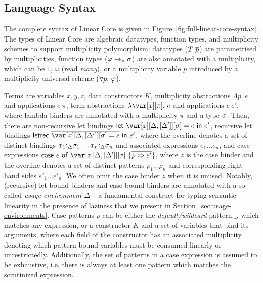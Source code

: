 \documentclass[acmsmall,review,screen]{acmart}
\newcommand{\llet}[2]{\mathsf{let}~#1~\mathsf{in}~#2}
\newcommand{\lletrec}[2]{\mathsf{letrec}~#1~\mathsf{in}~#2}
\newcommand{\ccase}[2]{\mathsf{case}~#1~\mathsf{of}~#2}
\begin{document}
%


\subsection{Language Syntax}

The complete syntax of Linear Core is given in Figure~\ref{fig:full-linear-core-syntax}.
%
The types of Linear Core are algebraic datatypes, function types, and
multiplicity schemes to support multiplicity polymorphism: datatypes
($T~\overline{p}$) are parametrised by multiplicities, function types
($\varphi\to_\pi\sigma$) are also annotated with a multiplicity, which can be $1$,
$\omega$ (read \emph{many}), or a multiplicity variable $p$ introduced by a
multiplicity universal scheme ($\forall p.~\varphi$).
%

%
Terms are variables $x,y,z$, data constructors $K$, multiplicity
abstractions $\Lambda p.~e$ and applications $e~\pi$, term abstractions
$\lambda \x[\pi].~e$ and applications $e~e'$, where lambda binders are
annotated with a multiplicity $\pi$ and a type $\sigma$. Then, there are
non-recursive let bindings $\llet{\xD = e}{e'}$, recursive let bindings
$\lletrec{\ov{\xD = e}}{e'}$, where the overline denotes a set of distinct
bindings $x_1{:}_{\Delta}\sigma_1\dots x_n{:}_{\Delta}\sigma_n$ and associated expressions
$e_1\dots e_n$, and case expressions $\ccase{e}{\zD~\{\ov{\rho \Rightarrow e'}\}}$,
where $z$ is the case binder and the overline denotes a set of distinct
patterns $\rho_1\dots \rho_n$ and corresponding right hand sides $e'_1\dots
e'_n$. We often omit the case binder $z$ when it is unused. Notably, (recursive) let-bound
binders and case-bound binders are annotated
with a so-called \emph{usage environment} $\Delta$ -- a fundamental construct
for typing semantic linearity in the presence of laziness that we present in
Section~\ref{sec:usage-environments}.
%
Case patterns $\rho$ can be either the \emph{default/wildcard}
pattern $\_$, which matches any expression, or a constructor $K$ and a set of
variables that bind its arguments, where each field of the constructor has an
associated multiplicity denoting which pattern-bound variables must be
consumed linearly or unrestrictedly.
Additionally, the set of patterns in a case expression is assumed to be exhaustive,
i.e. there is always at least one pattern which matches the scrutinized expression.
\end{document}
